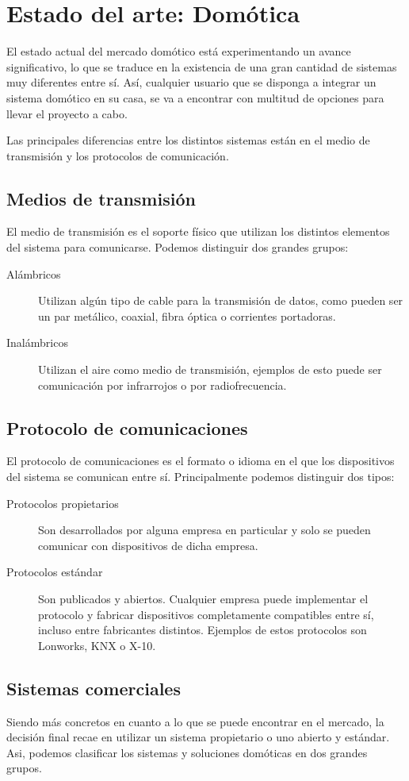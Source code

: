 \chapter{Estado del arte: Dom\'otica}
El estado actual del mercado dom\'otico est\'a experimentando un avance
significativo, lo que se traduce en la existencia de una gran cantidad de
sistemas muy diferentes entre sí. Así, cualquier usuario que se disponga a
integrar un sistema domótico en su casa, se va a encontrar con multitud de
opciones para llevar el proyecto a cabo.

Las principales diferencias entre los distintos sistemas est\'an en el medio
de transmisión y los protocolos de comunicación.

\section{Medios de transmisión}
El medio de transmisión es el soporte físico que utilizan los distintos
elementos del sistema para comunicarse. Podemos distinguir dos grandes
grupos:
\begin{description}
	\item[Al\'ambricos]
Utilizan algún tipo de cable para la transmisión de datos, como
pueden ser un par met\'alico, coaxial, fibra óptica o corrientes
portadoras.
	\item [Inal\'ambricos]
Utilizan el aire como medio de transmisión, ejemplos de esto
puede ser comunicación por infrarrojos o por radiofrecuencia.
\end{description}
\section{Protocolo de comunicaciones}
El protocolo de comunicaciones es el formato o idioma en el que los
dispositivos del sistema se comunican entre sí. Principalmente podemos
distinguir dos tipos:
\begin{description}
\item[Protocolos propietarios] Son desarrollados por alguna empresa en particular y solo
se pueden comunicar con dispositivos de dicha empresa.
\item[Protocolos est\'andar] Son publicados y abiertos. Cualquier empresa puede implementar el protocolo y fabricar dispositivos completamente compatibles entre sí, incluso entre fabricantes distintos. Ejemplos de estos protocolos son Lonworks, KNX o X-10.
\end{description}

\section{Sistemas comerciales}
Siendo m\'as concretos en cuanto a lo que se puede encontrar en el
mercado, la decisión final recae en utilizar un sistema propietario o uno abierto
y est\'andar. Asi, podemos clasificar los sistemas y soluciones domóticas en dos
grandes grupos.
